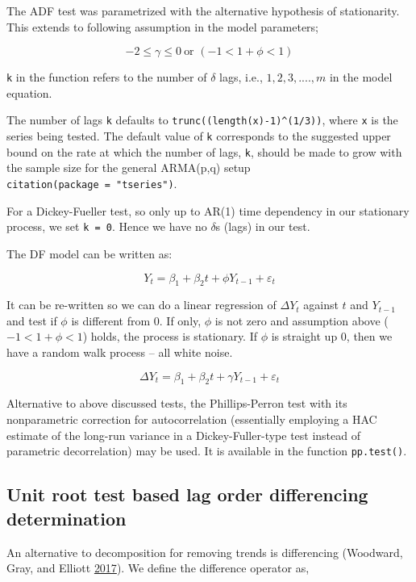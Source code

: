 \documentclass[
  12pt,
]{article}
\begin{document}
The ADF test was parametrized with the alternative hypothesis of stationarity. This extends to following assumption in the model parameters;

\[
-2 \leq \gamma \leq 0\ \text{or } (-1 < 1+\phi < 1)
\]

\texttt{k} in the function refers to the number of \(\delta\) lags, i.e., \(1, 2, 3, ...., m\) in the model equation.

The number of lags \texttt{k} defaults to \texttt{trunc((length(x)-1)\^{}(1/3))}, where \texttt{x} is the series being tested. The default value of \texttt{k} corresponds to the suggested upper bound on the rate at which the number of lags, \texttt{k}, should be made to grow with the sample size for the general ARMA(p,q) setup \texttt{citation(package\ =\ "tseries")}.

For a Dickey-Fueller test, so only up to AR(1) time dependency in our stationary process, we set \texttt{k\ =\ 0}. Hence we have no \(\delta\)s (lags) in our test.

The DF model can be written as:

\[
Y_t = \beta_1 + \beta_2 t + \phi Y_{t-1} + \varepsilon_t
\]

It can be re-written so we can do a linear regression of \(\Delta Y_t\) against \(t\) and \(Y_{t-1}\) and test if \(\phi\) is different from 0. If only, \(\phi\) is not zero and assumption above (\(-1 < 1+\phi < 1\)) holds, the process is stationary. If \(\phi\) is straight up 0, then we have a random walk process -- all white noise.

\[
\Delta {Y}_{t}=\beta_1+\beta_2 t+\gamma {Y}_{t-1} + \varepsilon_{t}
\]

Alternative to above discussed tests, the Phillips-Perron test with its nonparametric correction for autocorrelation (essentially employing a HAC estimate of the long-run variance in a Dickey-Fuller-type test instead of parametric decorrelation) may be used. It is available in the function \texttt{pp.test()}.

\hypertarget{unit-root-test-based-lag-order-differencing-determination}{%
\subsection{Unit root test based lag order differencing determination}\label{unit-root-test-based-lag-order-differencing-determination}}

An alternative to decomposition for removing trends is differencing (Woodward, Gray, and Elliott \protect\hyperlink{ref-woodward2017applied}{2017}). We define the difference operator as,
\end{document}
